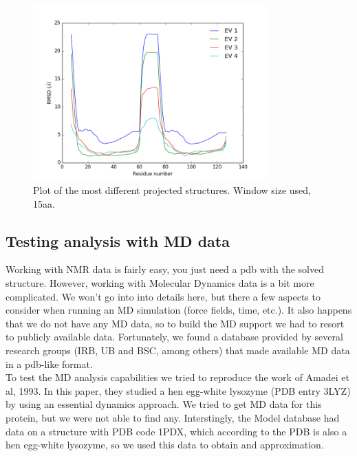 \documentclass[12pt]{article}
\begin{document}
\begin{figure} [!h]
\centering
\includegraphics[width=0.8\textwidth]{1joy_residue}
\caption{Plot of the most different projected structures. Window size used, 15aa.}
\label{fig:1joy_residue}
\end{figure}

\subsection{Testing analysis with MD data}

Working with NMR data is fairly easy, you just need a pdb with the solved structure. However, working with Molecular Dynamics data is a bit more complicated. We won't go into into details here, but there a few aspects to consider when running an MD simulation (force fields, time, etc.). It also happens that we do not have any MD data, so to build the MD support we had to resort to publicly available data. Fortunately, we found a database provided by several research groups (IRB, UB and BSC, among others)\citep{Model} that made available MD data in a pdb-like format.\\

To test the MD analysis capabilities we tried to reproduce the work of Amadei et al, 1993\citep{Amadei1993}. In this paper, they studied a hen egg-white lysozyme (PDB entry 3LYZ) by using an essential dynamics approach. We tried to get MD data for this protein, but we were not able to find any. Interstingly, the Model database had data on a structure with PDB code 1PDX, which according to the PDB is also a hen egg-white lysozyme, so we used this data to obtain and approximation.\\
\end{document}
